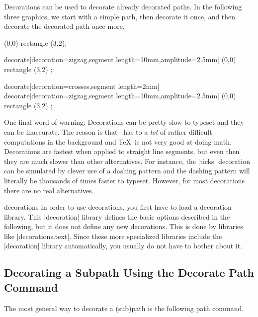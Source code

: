 Decorations can be used to decorate already decorated paths. In the
following three graphics, we start with a simple path, then decorate
it once, and then decorate the decorated path once more.

\begin{codeexample}[]
\tikz \fill [fill=blue!20,draw=blue,thick]
  (0,0) rectangle (3,2);
\end{codeexample}
\begin{codeexample}[]
\tikz \fill [fill=blue!20,draw=blue,thick]
  decorate[decoration={zigzag,segment length=10mm,amplitude=2.5mm}]
    { (0,0) rectangle (3,2) };
\end{codeexample}
\begin{codeexample}[]
\tikz \fill [fill=blue!20,draw=blue,thick]
  decorate[decoration={crosses,segment length=2mm}] {
    decorate[decoration={zigzag,segment length=10mm,amplitude=2.5mm}] {
      (0,0) rectangle (3,2)
    }
  };
\end{codeexample}

One final word of warning: Decorations can be pretty slow to
typeset and they can be inaccurate. The reason is that \pgfname\ has
to a \emph{lot} of rather difficult computations in the background and
\TeX\ is not very good at doing math. Decorations are fastest when
applied to straight line segments, but even then they are much slower
than other alternatives. For instance, the |ticks| decoration can be
simulated by clever use of a dashing pattern and the dashing pattern
will literally be thousands of times faster to typeset. However, for
most decorations there are no real alternatives.

\begin{tikzlibrary}{decorations}
  In order to use decorations, you first have to load a decoration
  library. This |decoration| library defines the basic options
  described in the following, but it does not define any new
  decorations. This is done by libraries like
  |decorations.text|. Since these more specialized libraries include
  the |decoration| library automatically, you usually do not have to
  bother about it.
\end{tikzlibrary}



\subsection{Decorating a Subpath Using the Decorate Path Command}

The most general way to decorate a (sub)path is the following path
command.

